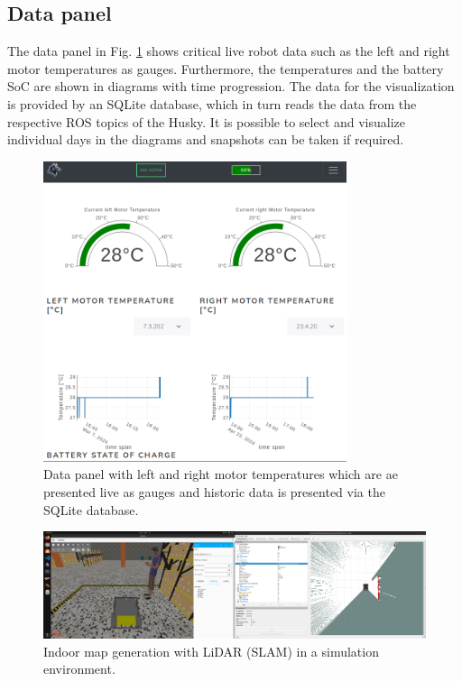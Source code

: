 \documentclass[letterpaper, 10 pt, conference]{ieeeconf}  %
\begin{document}
\subsection{Data panel}
The data panel in Fig. \ref{fig:overviewplots} shows critical live robot data such as the left and right motor temperatures as gauges. 
Furthermore, the temperatures and the battery SoC are shown in diagrams with time progression. 
The data for the visualization is provided by an SQLite database, which in turn reads the data from the respective ROS topics of the Husky. 
It is possible to select and visualize individual days in the diagrams and snapshots can be taken if required.
\begin{figure}[t]
    \centerline{\includegraphics[width=8.9cm]{images/tabletdatasm.png}}
    \caption{Data panel with left and right motor temperatures which are ae presented live as gauges and historic data is presented via the SQLite database.}
    \label{fig:overviewplots}
\end{figure}
\begin{figure}[htbp]
    \centerline{\includegraphics[width=16.35cm]{images/sim_husky_mapping.png}}
    \caption{Indoor map generation with LiDAR (SLAM) in a simulation environment.}
    \label{fig:huskymapping}
\end{figure}
\end{document}
